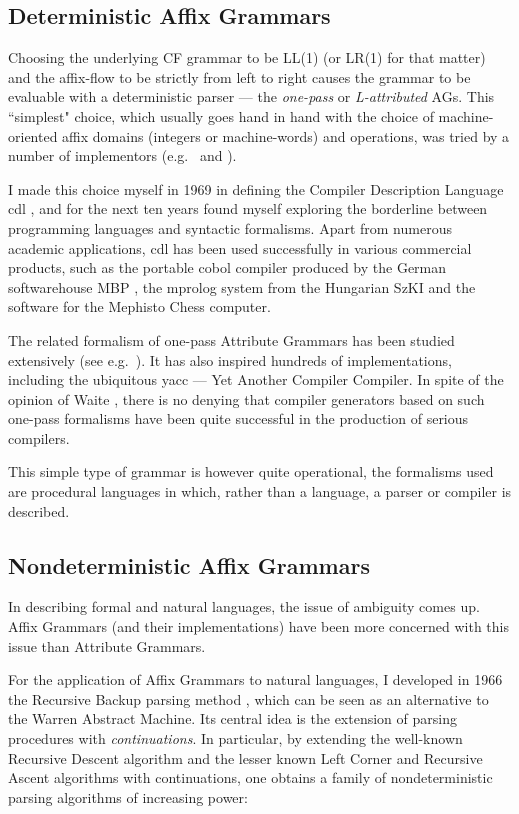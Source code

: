 \subsection{Deterministic Affix Grammars}
Choosing the underlying CF grammar to be LL(1) (or LR(1) for that matter)
and the affix-flow to be strictly from left to right causes the grammar
to be evaluable with a deterministic parser ---
the {\em one-pass} or {\em L-attributed} AGs.
This ``simplest" choice, which usually goes hand in hand with the choice of
machine-oriented affix domains (integers or machine-words)
and operations, was tried by a number of implementors (e.g.\
\cite{grune:diss} and \cite{beney:starlet}).

I made this choice myself in 1969 in defining the Compiler Description
Language {\sc cdl} \cite{koster:cdl1}, and for the next ten years
\cite{bayer:cdl2lab} found myself
exploring the borderline between programming languages and syntactic
formalisms. Apart from numerous academic applications, {\sc cdl} has been
used successfully in various commercial products,
such as the portable {\sc cobol} compiler
produced by the German softwarehouse MBP \cite{mbp:cobol}, the {\sc mprolog}
system \cite{domolki:mprolog}
from the Hungarian SzKI and the software for the Mephisto Chess computer.

The related formalism of one-pass Attribute Grammars
has been studied extensively (see e.g.\ \cite{akker:attrevp}).
It has also
inspired hundreds of implementations, including the ubiquitous {\sc yacc}
--- Yet Another Compiler Compiler.
In spite of the opinion of Waite \cite{waite:grumble}, there is
no denying that compiler generators based on such one-pass formalisms
have been quite successful in the production of serious compilers.

This simple type of grammar is however quite operational, the formalisms used
are procedural languages in which, rather than a language,
a parser or compiler is described.

\subsection{Nondeterministic Affix Grammars}
In describing formal and natural languages, the issue of
ambiguity comes up. Affix Grammars (and their implementations) have
been more concerned with this issue than Attribute Grammars.

For the application of Affix Grammars to natural languages, I developed
in 1966 the Recursive Backup parsing method \cite{koster:rbackup},
which can be seen as an alternative to the Warren Abstract Machine.
Its central idea is the extension of parsing procedures with
{\em continuations}. In particular, by extending the
well-known Recursive Descent algorithm and the lesser known Left Corner
\cite{akker:diss} and Recursive Ascent \cite{kruseman:ra}
algorithms with continuations,
one obtains a family of nondeterministic parsing algorithms of
increasing power:

